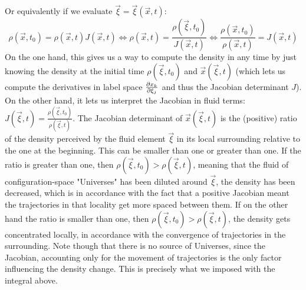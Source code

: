 \documentclass[11pt, a4paper]{article} %
\DeclareRobustCommand{\mybox}[2][gray!10]{%
\begin{tcolorbox}[   %
        left=0.2cm,
        right=0.2cm,
        top=0.15cm,
        bottom=0.15cm,
        colback=#1,
        colframe=#1,
        width=\dimexpr\textwidth\relax, 
        enlarge left by=0mm,
        boxsep=5pt,
        arc=0pt,outer arc=0pt,
        ]
        #2
\end{tcolorbox}
}
\begin{document}
\mybox{
Or equivalently if we evaluate $\vec{\xi}=\vec{\xi}(\vec{x},t)$:
\begin{equation}
\rho(\vec{x},t_0) = \rho(\vec{x},t) J(\vec{x},t)\Longleftrightarrow \rho(\vec{x},t)=\frac{\rho(\vec{\xi},t_0)}{J(\vec{x},t)}\Longleftrightarrow \frac{\rho(\vec{x},t_0)}{\rho(\vec{x},t)}=J(\vec{x},t)
\end{equation}
On the one hand, this gives us a way to compute the density in any time by just knowing the density at the initial time $\rho(\vec{\xi},t_0)$ and $\vec{x}(\vec{\xi},t)$ (which lets us compute the derivatives in label space $\pdv{x_k}{\xi_j}$ and thus the Jacobian determinant $J$). On the other hand, it lets us interpret the Jacobian in fluid terms: $J(\vec{\xi},t)=\frac{\rho(\vec{\xi},t_0)}{\rho(\vec{\xi},t)}$. The Jacobian determinant of $\vec	{x}(\vec{\xi},t)$ is the (positive) ratio of the density perceived by the fluid element $\vec{\xi}$ in its local surrounding relative to the one at the beginning. This can be smaller than one or greater than one. If the ratio is greater than one, then $\rho(\vec{\xi},t_0)>\rho(\vec{\xi},t)$, meaning that the fluid of configuration-space "Universes" has been diluted around $\vec{\xi}$, the density has been decreased, which is in accordance with the fact that a positive Jacobian meant the trajectories in that locality get more spaced between them. If on the other hand the ratio is smaller than one, then $\rho(\vec{\xi},t_0)>\rho(\vec{\xi},t)$, the density gets concentrated locally, in accordance with the convergence of trajectories in the surrounding. Note though that there is no source of Universes, since the Jacobian, accounting only for the movement of trajectories is the only factor influencing the density change. This is precisely what we imposed with the integral above.\\

}
\end{document}
